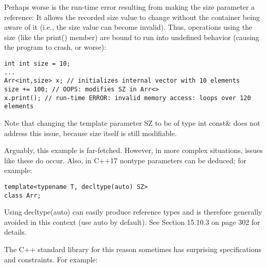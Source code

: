 Perhaps worse is the run-time error resulting from making the size parameter a reference: It allows the recorded size value to change without the container being aware of it (i.e., the size value can become invalid). Thus, operations using the size (like the print() member) are bound to run into undefined behavior (causing the program to crash, or worse):

\begin{lstlisting}[style=styleCXX]
int int size = 10;
...
Arr<int,size> x; // initializes internal vector with 10 elements
size += 100; // OOPS: modifies SZ in Arr<>
x.print(); // run-time ERROR: invalid memory access: loops over 120 elements
\end{lstlisting}

Note that changing the template parameter SZ to be of type int const\& does not address this issue, because size itself is still modifiable.

Arguably, this example is far-fetched. However, in more complex situations, issues like these do occur. Also, in C++17 nontype parameters can be deduced; for example:

\begin{lstlisting}[style=styleCXX]
template<typename T, decltype(auto) SZ>
class Arr;
\end{lstlisting}

Using decltype(auto) can easily produce reference types and is therefore generally avoided in this context (use auto by default). See Section 15.10.3 on page 302 for details.

The C++ standard library for this reason sometimes has surprising specifications and constraints. For example:

